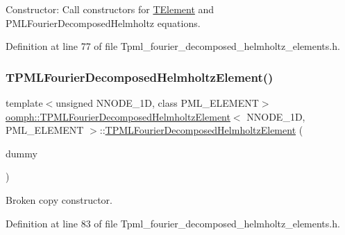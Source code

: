 Constructor\+: Call constructors for \hyperlink{classoomph_1_1TElement}{T\+Element} and P\+M\+L\+Fourier\+Decomposed\+Helmholtz equations. 



Definition at line 77 of file Tpml\+\_\+fourier\+\_\+decomposed\+\_\+helmholtz\+\_\+elements.\+h.

\mbox{\label{classoomph_1_1TPMLFourierDecomposedHelmholtzElement_a98e945f2c505dc8ec7f70a9491b5ee2f}} 
\subsubsection{\texorpdfstring{T\+P\+M\+L\+Fourier\+Decomposed\+Helmholtz\+Element()}{TPMLFourierDecomposedHelmholtzElement()}\hspace{0.1cm}{\footnotesize\ttfamily [2/2]}}
{\footnotesize\ttfamily template$<$unsigned N\+N\+O\+D\+E\+\_\+1D, class P\+M\+L\+\_\+\+E\+L\+E\+M\+E\+NT$>$ \\
\hyperlink{classoomph_1_1TPMLFourierDecomposedHelmholtzElement}{oomph\+::\+T\+P\+M\+L\+Fourier\+Decomposed\+Helmholtz\+Element}$<$ N\+N\+O\+D\+E\+\_\+1D, P\+M\+L\+\_\+\+E\+L\+E\+M\+E\+NT $>$\+::\hyperlink{classoomph_1_1TPMLFourierDecomposedHelmholtzElement}{T\+P\+M\+L\+Fourier\+Decomposed\+Helmholtz\+Element} (\begin{DoxyParamCaption}\item[{const \hyperlink{classoomph_1_1TPMLFourierDecomposedHelmholtzElement}{T\+P\+M\+L\+Fourier\+Decomposed\+Helmholtz\+Element}$<$ N\+N\+O\+D\+E\+\_\+1D, P\+M\+L\+\_\+\+E\+L\+E\+M\+E\+NT $>$ \&}]{dummy }\end{DoxyParamCaption})\hspace{0.3cm}{\ttfamily [inline]}}



Broken copy constructor. 



Definition at line 83 of file Tpml\+\_\+fourier\+\_\+decomposed\+\_\+helmholtz\+\_\+elements.\+h.



